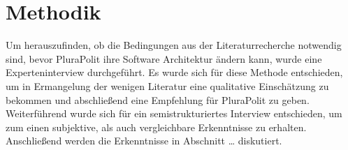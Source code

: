 \section{Methodik}
\label{sec:methodik}

Um herauszufinden, ob die Bedingungen aus der Literaturrecherche notwendig sind, bevor PluraPolit ihre Software Architektur ändern kann, wurde eine Experteninterview durchgeführt. Es wurde sich für diese Methode entschieden, um in Ermangelung der wenigen Literatur eine qualitative Einschätzung zu bekommen und abschließend eine Empfehlung für PluraPolit zu geben. Weiterführend wurde sich für ein semistrukturiertes Interview entschieden, um zum einen subjektive, als auch vergleichbare Erkenntnisse zu erhalten. Anschließend werden die Erkenntnisse in Abschnitt … diskutiert.





